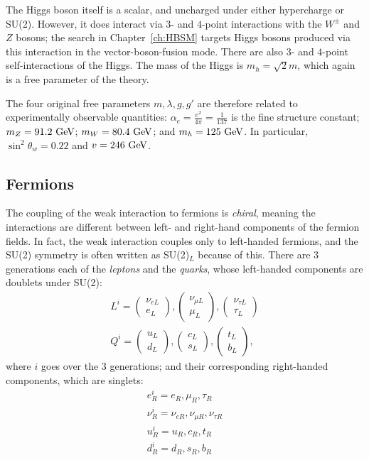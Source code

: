 The Higgs boson itself is a scalar, and uncharged under either hypercharge or SU(2).
However, it does interact via $3$- and $4$-point interactions with the $W^\pm$ and $Z$ bosons; the search in Chapter~\ref{ch:HBSM} targets Higgs bosons produced via this interaction in the vector-boson-fusion mode.
There are also $3$- and $4$-point self-interactions of the Higgs.
The mass of the Higgs is $m_h = \sqrt{2}m$, which again is a free parameter of the theory.

The four original free parameters $m,\lambda,g,g'$ are therefore related to experimentally observable quantities: $\alpha_e = \frac{e^2}{4\pi} = \frac{1}{137}$ is the fine structure constant; $m_Z = 91.2~\mathrm{GeV}$; $m_W = 80.4~\mathrm{GeV}$; and $m_h = 125~\mathrm{GeV}$.
In particular, $\sin^2\theta_w=0.22$ and $v=246~\mathrm{GeV}$.

\subsection{Fermions}
\label{sec:SM:EW_matter}
The coupling of the weak interaction to fermions is \textit{chiral}, meaning the interactions are different between left- and right-hand components of the fermion fields.
In fact, the weak interaction couples only to left-handed fermions, and the SU(2) symmetry is often written as SU(2)$_L$ because of this.
There are $3$ generations each of the \textit{leptons} and the \textit{quarks}, whose left-handed components are doublets under SU(2):
\begin{align}
L^i = \begin{pmatrix}\nu_{eL}\\e_L\end{pmatrix},\begin{pmatrix}\nu_{\mu L}\\\mu_L\end{pmatrix},\begin{pmatrix}\nu_{\tau L}\\\tau_L\end{pmatrix}\\
Q^i = \begin{pmatrix}u_{L}\\d_L\end{pmatrix},\begin{pmatrix}c_{L}\\s_L\end{pmatrix},\begin{pmatrix}t_{L}\\b_L\end{pmatrix},
\end{align}
where $i$ goes over the $3$ generations; and their corresponding right-handed components, which are singlets:
\begin{align}
e^i_R = e_R,\mu_R,\tau_R\\
\nu^i_R = \nu_{eR},\nu_{\mu R},\nu_{\tau R}\\
u^i_R = u_R,c_R,t_R\\
d^i_R = d_R,s_R,b_R
\end{align}

